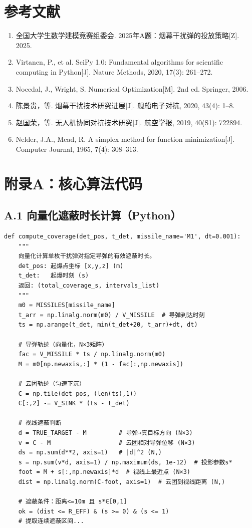 \documentclass[12pt, a4paper]{article}
\begin{document}
\section*{参考文献}

\begin{enumerate}
\item 全国大学生数学建模竞赛组委会. 2025年A题：烟幕干扰弹的投放策略[Z]. 2025.
\item Virtanen, P., et al. SciPy 1.0: Fundamental algorithms for scientific computing in Python[J]. Nature Methods, 2020, 17(3): 261--272.
\item Nocedal, J., Wright, S. Numerical Optimization[M]. 2nd ed. Springer, 2006.
\item 陈景贵，等. 烟幕干扰技术研究进展[J]. 舰船电子对抗, 2020, 43(4): 1--8.
\item 赵国荣，等. 无人机协同对抗技术研究[J]. 航空学报, 2019, 40(S1): 722894.
\item Nelder, J.A., Mead, R. A simplex method for function minimization[J]. Computer Journal, 1965, 7(4): 308--313.
\end{enumerate}

\appendix
\section*{附录A：核心算法代码}

\subsection*{A.1 向量化遮蔽时长计算（Python）}

\begin{verbatim}
def compute_coverage(det_pos, t_det, missile_name='M1', dt=0.001):
    """
    向量化计算单枚干扰弹对指定导弹的有效遮蔽时长。
    det_pos: 起爆点坐标 [x,y,z] (m)
    t_det:   起爆时刻 (s)
    返回: (total_coverage_s, intervals_list)
    """
    m0 = MISSILES[missile_name]
    t_arr = np.linalg.norm(m0) / V_MISSILE  # 导弹到达时刻
    ts = np.arange(t_det, min(t_det+20, t_arr)+dt, dt)

    # 导弹轨迹（向量化，N×3矩阵）
    fac = V_MISSILE * ts / np.linalg.norm(m0)
    M = m0[np.newaxis,:] * (1 - fac[:,np.newaxis])

    # 云团轨迹（匀速下沉）
    C = np.tile(det_pos, (len(ts),1))
    C[:,2] -= V_SINK * (ts - t_det)

    # 视线遮蔽判断
    d = TRUE_TARGET - M         # 导弹→真目标方向 (N×3)
    v = C - M                   # 云团相对导弹位移 (N×3)
    ds = np.sum(d**2, axis=1)   # |d|^2 (N,)
    s = np.sum(v*d, axis=1) / np.maximum(ds, 1e-12)  # 投影参数s*
    foot = M + s[:,np.newaxis]*d  # 视线上最近点 (N×3)
    dist = np.linalg.norm(C-foot, axis=1)  # 云团到视线距离 (N,)

    # 遮蔽条件：距离<=10m 且 s*∈[0,1]
    ok = (dist <= R_EFF) & (s >= 0) & (s <= 1)
    # 提取连续遮蔽区间...
\end{verbatim}
\end{document}
